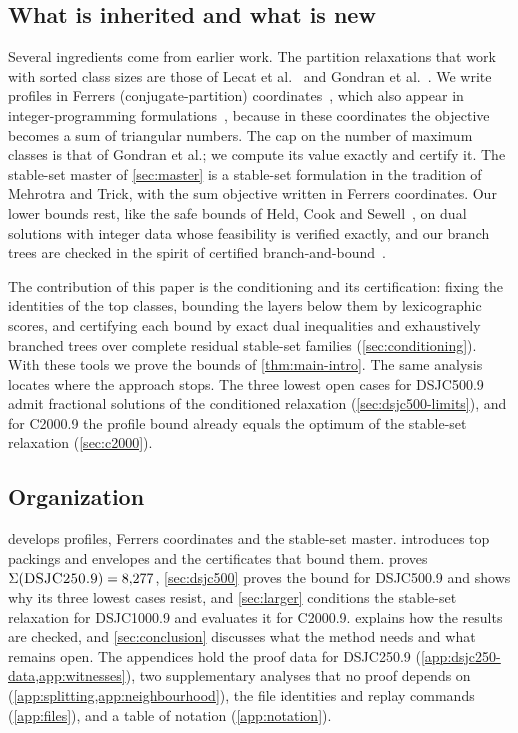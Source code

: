 \documentclass[11pt]{article}
\theoremstyle{definition}
\newcommand{\DSJCTwoFifty}{\textnormal{\textsc{DSJC250.9}}}
\newcommand{\DSJCFiveHundred}{\textnormal{\textsc{DSJC500.9}}}
\newcommand{\DSJCThousand}{\textnormal{\textsc{DSJC1000.9}}}
\newcommand{\CTwoThousand}{\textnormal{\textsc{C2000.9}}}
\begin{document}
\subsection{What is inherited and what is new}

Several ingredients come from earlier work. The partition relaxations that
work with sorted class sizes are those of Lecat et al.~\cite{lecat2017} and
Gondran et al.~\cite{gondran2019}. We
write profiles in Ferrers (conjugate-partition)
coordinates~\cite{andrews1998}, which also appear in integer-programming
formulations~\cite{gavenciak2019}, because in these coordinates the objective
becomes a sum of triangular numbers. The cap on the number of maximum classes
is that of Gondran et al.; we compute its value exactly and certify it. The
stable-set master of \cref{sec:master} is a stable-set formulation in the
tradition of Mehrotra and Trick, with the sum objective written in Ferrers
coordinates. Our lower bounds
rest, like the safe bounds of Held, Cook and Sewell~\cite{held2012}, on dual
solutions with integer data whose feasibility is verified exactly, and our
branch trees are checked in the spirit of certified
branch-and-bound~\cite{larrosa2011,cheung2017}.

The contribution of this paper is the conditioning and its certification:
fixing the identities of the top classes, bounding the layers below them by
lexicographic scores, and certifying each bound by exact dual inequalities
and exhaustively branched trees over complete residual stable-set families
(\cref{sec:conditioning}). With these tools we prove the bounds of
\cref{thm:main-intro}. The same analysis locates where the approach stops.
The three lowest open cases for \DSJCFiveHundred{} admit fractional solutions
of the conditioned relaxation (\cref{sec:dsjc500-limits}), and for
\CTwoThousand{} the profile bound already equals the optimum of the
stable-set relaxation (\cref{sec:c2000}).

\subsection{Organization}

 develops profiles, Ferrers coordinates and the stable-set
master.  introduces top packings and envelopes and the
certificates that bound them.  proves
$\Sigma(\DSJCTwoFifty)=8{,}277$, \cref{sec:dsjc500} proves the bound for
\DSJCFiveHundred{} and shows why its three lowest cases resist, and
\cref{sec:larger} conditions the stable-set relaxation for \DSJCThousand{} and
evaluates it for \CTwoThousand{}.  explains how the
results are checked, and \cref{sec:conclusion} discusses what the method
needs and what remains open. The appendices hold the proof data for
\DSJCTwoFifty{} (\cref{app:dsjc250-data,app:witnesses}), two supplementary
analyses that no proof depends on (\cref{app:splitting,app:neighbourhood}),
the file identities and replay commands (\cref{app:files}), and a table of
notation (\cref{app:notation}).
\end{document}
